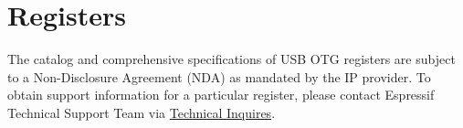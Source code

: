 \documentclass[main\_\_EN.tex]{subfiles}
\begin{document}
\section{Registers}

The catalog and comprehensive specifications of USB OTG registers are subject to a Non-Disclosure Agreement (NDA) as mandated by the IP provider. To obtain support information for a particular register, please contact Espressif Technical Support Team via \href{https://www.espressif.com/en/contact-us/technical-inquiries}{Technical Inquires}.
\end{document}
